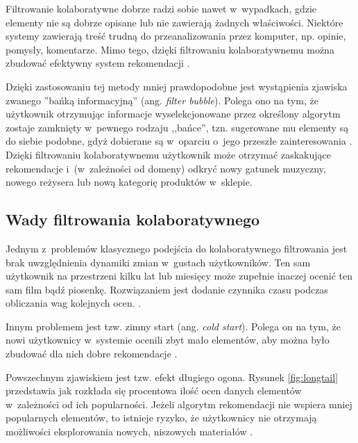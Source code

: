 \documentclass[twoside]{iisthesis}
\begin{document}
	  Filtrowanie kolaboratywne dobrze radzi sobie nawet w~wypadkach, gdzie elementy nie są dobrze opisane lub nie zawierają żadnych właściwości. Niektóre systemy zawierają treść trudną do przeanalizowania przez komputer, np. opinie, pomysły, komentarze. Mimo tego, dzięki filtrowaniu kolaboratywnemu można zbudować efektywny system rekomendacji \cite{melville2002content}.
	  
	  Dzięki zastosowaniu tej metody mniej prawdopodobne jest wystąpienia zjawiska zwanego ''bańką informacyjną'' (ang. \textit{filter bubble}). Polega ono na tym, że użytkownik otrzymując informacje wyselekcjonowane przez określony algorytm zostaje zamknięty w~pewnego rodzaju ,,bańce'', tzn. sugerowane mu elementy są do siebie podobne, gdyż dobierane są w~oparciu o~jego przeszłe zainteresowania \cite{pariser2011filter}. Dzięki filtrowaniu kolaboratywnemu użytkownik może otrzymać zaskakujące rekomendacje i~(w~zależności od domeny) odkryć nowy gatunek muzyczny, nowego reżysera lub nową kategorię produktów w~sklepie.	 
	  
	  \subsection{Wady filtrowania kolaboratywnego}
	  
	  Jednym z~problemów klasycznego podejścia do kolaboratywnego filtrowania jest brak uwzględnienia dynamiki zmian w~gustach użytkowników. Ten sam użytkownik na przestrzeni kilku lat lub miesięcy może zupełnie inaczej ocenić ten sam film bądź piosenkę. Rozwiązaniem jest dodanie czynnika czasu podczas obliczania wag kolejnych ocen. \cite{id:NewRecommentationAlgoritmBasedOnSocialNetwork,id:NextSongRecommendationWithTemporalDynamics,koren2009matrix}.
	  
	  Innym problemem jest tzw. zimny start (ang. \textit{cold start}). Polega on na tym, że nowi użytkownicy w~systemie ocenili zbyt mało elementów, aby można było zbudować dla nich dobre rekomendacje \cite{id:RubensRecSysHB2010,id:zhang2015hybrid}.
	  
	  Powszechnym zjawiskiem jest tzw. efekt długiego ogona. Rysunek \ref{fig:longtail} przedstawia jak rozkłada się procentowa ilość ocen danych elementów w~zależności od ich popularności. Jeżeli algorytm rekomendacji nie wspiera mniej popularnych elementów, to istnieje ryzyko, że użytkownicy nie otrzymają możliwości eksplorowania nowych, niszowych materiałów \cite{id:celma2010music,id:RubensRecSysHB2010}.
	  
\end{document}
